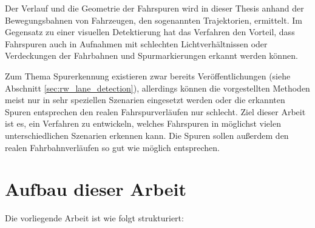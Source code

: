 Der Verlauf und die Geometrie der Fahrspuren wird in dieser Thesis anhand der Bewegungsbahnen von Fahrzeugen, den sogenannten Trajektorien,
ermittelt. Im Gegensatz zu einer visuellen Detektierung hat das Verfahren den Vorteil, dass Fahrspuren auch in Aufnahmen
mit schlechten Lichtverhältnissen oder Verdeckungen der Fahrbahnen und Spurmarkierungen erkannt werden können.

Zum Thema Spurerkennung existieren zwar bereits Veröffentlichungen (siehe Abschnitt \ref{sec:rw_lane_detection}),
allerdings können die
vorgestellten Methoden meist nur in sehr speziellen Szenarien eingesetzt werden oder die erkannten Spuren
entsprechen den realen Fahrspurverläufen nur schlecht. Ziel dieser Arbeit ist es, ein Verfahren zu entwickeln,
welches Fahrspuren in möglichst vielen unterschiedlichen Szenarien erkennen kann.
Die Spuren sollen außerdem den realen Fahrbahnverläufen so gut wie möglich entsprechen.

\section{Aufbau dieser Arbeit}
\label{sec:aufbau}

Die vorliegende Arbeit ist wie folgt strukturiert:

